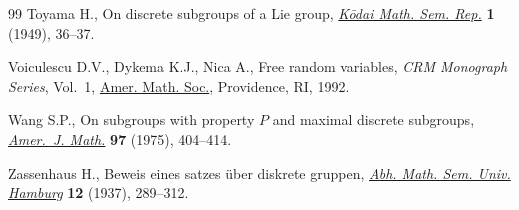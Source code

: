 \documentclass[pdftex]{sigma}
\numberwithin{equation}{section}
\begin{document}
\begin{thebibliography}{99}
Toyama H., On discrete subgroups of a {L}ie group, \href{https://doi.org/10.2996/kmj/1138833432}{\textit{K\=odai Math. Sem.
 Rep.}} \textbf{1} (1949), 36--37.

Voiculescu D.V., Dykema K.J., Nica A., Free random variables, \textit{CRM
 Monograph Series}, Vol.~1, \href{https://doi.org/10.1090/crmm/001}{Amer. Math. Soc.}, Providence, RI, 1992.

Wang S.P., On subgroups with property {$P$} and maximal discrete subgroups,
 \href{https://doi.org/10.2307/2373719}{\textit{Amer.~J. Math.}} \textbf{97} (1975), 404--414.

Zassenhaus H., Beweis eines satzes \"uber diskrete gruppen, \href{https://doi.org/10.1007/BF02948950}{\textit{Abh. Math.
 Sem. Univ. Hamburg}} \textbf{12} (1937), 289--312.

\end{thebibliography}\LastPageEnding
\end{document}
